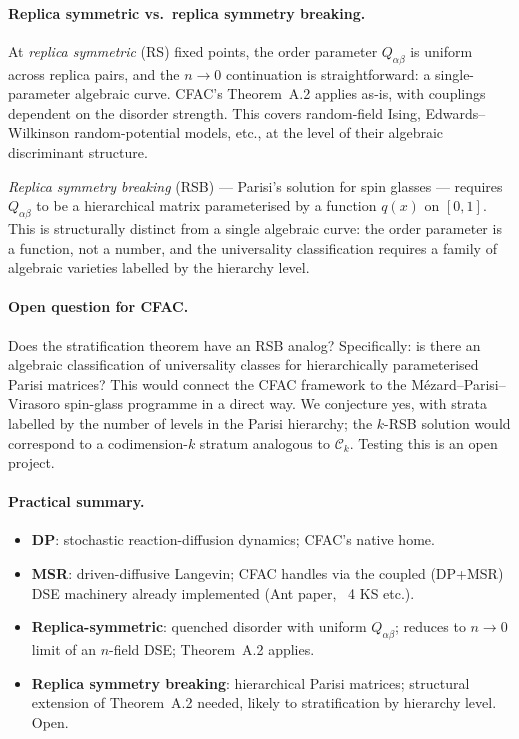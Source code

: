 \documentclass[11pt,a4paper]{article}
\theoremstyle{plain}
\newcommand{\Ck}{\mathcal{C}}
\begin{document}
\paragraph{Replica symmetric vs.\ replica symmetry breaking.}
At \emph{replica symmetric} (RS) fixed points, the order parameter
$Q_{\alpha\beta}$ is uniform across replica pairs, and the $n\to 0$
continuation is straightforward: a single-parameter algebraic curve.
CFAC's Theorem~A.2 applies as-is, with couplings dependent on the
disorder strength.  This covers random-field Ising, Edwards--Wilkinson
random-potential models, etc., at the level of their algebraic
discriminant structure.

\emph{Replica symmetry breaking} (RSB) --- Parisi's solution for spin
glasses --- requires $Q_{\alpha\beta}$ to be a hierarchical matrix
parameterised by a function $q(x)$ on $[0,1]$.  This is structurally
distinct from a single algebraic curve: the order parameter is a
function, not a number, and the universality classification requires
a family of algebraic varieties labelled by the hierarchy level.

\paragraph{Open question for CFAC.}
Does the stratification theorem have an RSB analog?  Specifically:
is there an algebraic classification of universality classes for
hierarchically parameterised Parisi matrices?  This would connect the
CFAC framework to the Mézard--Parisi--Virasoro spin-glass programme in a
direct way.  We conjecture yes, with strata labelled by the number of
levels in the Parisi hierarchy; the $k$-RSB solution would correspond
to a codimension-$k$ stratum analogous to $\Ck_{k}$.  Testing this is
an open project.

\paragraph{Practical summary.}
\begin{itemize}[leftmargin=1.2em]
\item \textbf{DP}: stochastic reaction-diffusion dynamics; CFAC's native home.
\item \textbf{MSR}: driven-diffusive Langevin; CFAC handles via the coupled
  (DP+MSR) DSE machinery already implemented (Ant paper, ~4 KS etc.).
\item \textbf{Replica-symmetric}: quenched disorder with uniform
  $Q_{\alpha\beta}$; reduces to $n\to 0$ limit of an $n$-field DSE;
  Theorem~A.2 applies.
\item \textbf{Replica symmetry breaking}: hierarchical Parisi matrices;
  structural extension of Theorem~A.2 needed, likely to stratification
  by hierarchy level.  Open.
\end{itemize}
\end{document}
